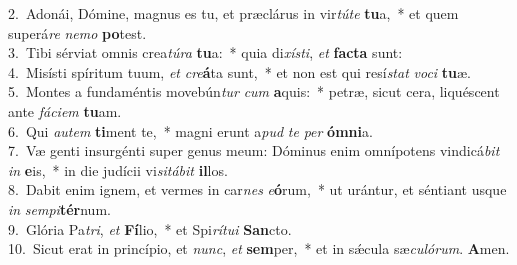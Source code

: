 {2.~}Adonái, Dómine, magnus es tu, et præclárus in vir\textit{tú}\textit{te} \textbf{tu}a,~* et quem superá\textit{re} \textit{ne}\textit{mo} \textbf{po}test.\\
{3.~}Tibi sérviat omnis crea\textit{tú}\textit{ra} \textbf{tu}a:~* quia di\textit{xí}\textit{sti}, \textit{et} \textbf{fa}\textbf{cta} sunt:\\
{4.~}Misísti spíritum tuum, \textit{et} \textit{cre}\textbf{á}ta sunt,~* et non est qui resí\textit{stat} \textit{vo}\textit{ci} \textbf{tu}æ.\\
{5.~}Montes a fundaméntis movebún\textit{tur} \textit{cum} \textbf{a}quis:~* petræ, sicut cera, liquéscent ante \textit{fá}\textit{ci}\textit{em} \textbf{tu}am.\\
{6.~}Qui \textit{au}\textit{tem} \textbf{ti}ment te,~* magni erunt a\textit{pud} \textit{te} \textit{per} \textbf{óm}\textbf{ni}a.\\
{7.~}Væ genti insurgénti super genus meum: Dóminus enim omnípotens vindicá\textit{bit} \textit{in} \textbf{e}is,~* in die judícii vi\textit{si}\textit{tá}\textit{bit} \textbf{il}los.\\
{8.~}Dabit enim ignem, et vermes in car\textit{nes} \textit{e}\textbf{ó}rum,~* ut urántur, et séntiant usque \textit{in} \textit{sem}\textit{pi}\textbf{tér}num.\\
{9.~}Glória Pa\textit{tri}, \textit{et} \textbf{Fí}lio,~* et Spi\textit{rí}\textit{tu}\textit{i} \textbf{San}cto.\\
{10.~}Sicut erat in princípio, et \textit{nunc}, \textit{et} \textbf{sem}per,~* et in sǽcula sæ\textit{cu}\textit{ló}\textit{rum}. \textbf{A}men.\\

